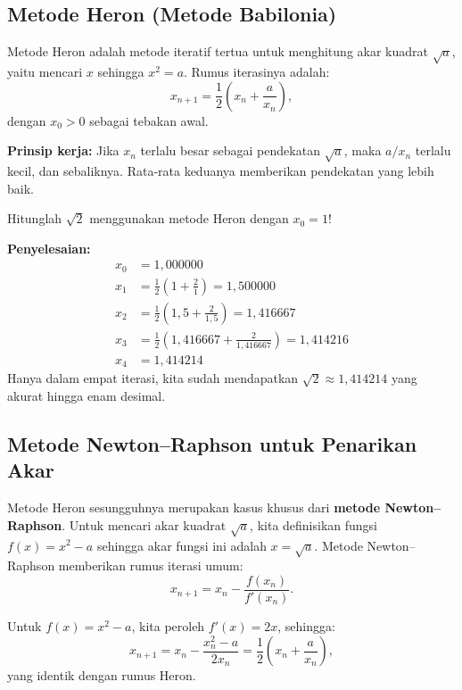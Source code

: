 \subsection{Metode Heron (Metode Babilonia)}

Metode Heron adalah metode iteratif tertua untuk menghitung akar kuadrat $\sqrt{a}$, yaitu mencari $x$ sehingga $x^2 = a$. Rumus iterasinya adalah:
\begin{equation}
x_{n+1} = \frac{1}{2}\left(x_n + \frac{a}{x_n}\right),
\end{equation}
dengan $x_0 > 0$ sebagai tebakan awal.

\textbf{Prinsip kerja:} Jika $x_n$ terlalu besar sebagai pendekatan $\sqrt{a}$, maka $a/x_n$ terlalu kecil, dan sebaliknya. Rata-rata keduanya memberikan pendekatan yang lebih baik.

\begin{exmp}
Hitunglah $\sqrt{2}$ menggunakan metode Heron dengan $x_0 = 1$!

\textbf{Penyelesaian:}\\
\begin{align*}
x_0 &= 1{,}000000 \\
x_1 &= \frac{1}{2}\left(1 + \frac{2}{1}\right) = 1{,}500000 \\
x_2 &= \frac{1}{2}\left(1{,}5 + \frac{2}{1{,}5}\right) = 1{,}416667 \\
x_3 &= \frac{1}{2}\left(1{,}416667 + \frac{2}{1{,}416667}\right) = 1{,}414216 \\
x_4 &= 1{,}414214
\end{align*}
Hanya dalam empat iterasi, kita sudah mendapatkan $\sqrt{2} \approx 1{,}414214$ yang akurat hingga enam desimal.
\end{exmp}

\subsection{Metode Newton--Raphson untuk Penarikan Akar}

Metode Heron sesungguhnya merupakan kasus khusus dari \textbf{metode Newton--Raphson}. Untuk mencari akar kuadrat $\sqrt{a}$, kita definisikan fungsi $f(x) = x^2 - a$ sehingga akar fungsi ini adalah $x = \sqrt{a}$. Metode Newton--Raphson memberikan rumus iterasi umum:
\begin{equation}
x_{n+1} = x_n - \frac{f(x_n)}{f'(x_n)}.
\end{equation}

Untuk $f(x) = x^2 - a$, kita peroleh $f'(x) = 2x$, sehingga:
\[
x_{n+1} = x_n - \frac{x_n^2 - a}{2x_n} = \frac{1}{2}\left(x_n + \frac{a}{x_n}\right),
\]
yang identik dengan rumus Heron.

